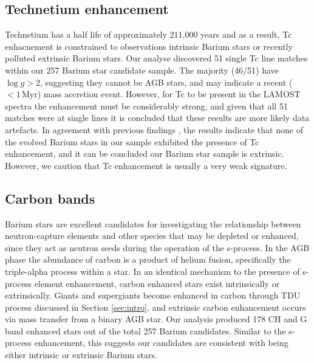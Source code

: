 \documentclass[a4paper,fleqn,usenatbib]{mnras}
\begin{document}
\subsection{Technetium enhancement}

Technetium has a half life of approximately 211,000 years and as a result, Tc enhacnement is constrained to observations intrinsic Barium stars \citep{jorissen1993} or recently polluted extrinsic Barium stars. Our analyse discovered 51 single Tc line matches within our 257 Barium star candidate sample. The majority (46/51) have $\log{g} > 2$, suggesting they cannot be AGB stars, and may indicate a recent ($<1\,\textrm{Myr}$) mass accretion event. However, for Tc to be present in the LAMOST spectra the enhancement must be considerably strong, and given that all 51 matches were at single lines it is concluded that these results are more likely data artefacts. In agreement with previous findings \citep[e.g.,][]{little1987,smith1984,smith1983}, the results indicate that none of the evolved Barium stars in our sample exhibited the presence of Tc enhancement, and it can be concluded our Barium star sample is extrinsic. However, we caution that Tc enhancement is usually a very weak signature.

\subsection{Carbon bands}
Barium stars are excellent candidates for investigating the relationship between neutron-capture elements and other species that may be depleted or enhanced, since they act as neutron seeds during the operation of the s-process. In the AGB phase the abundance of carbon is a product of helium fusion, specifically the triple-alpha process within a star. In an identical mechanism to the presence of s-process element enhancement, carbon enhanced stars exist intrinsically or extrinsically. Giants and supergiants become enhanced in carbon through TDU process discussed in Section \ref{sec:intro}, and extrinsic carbon enhancement occurs via mass transfer from a binary AGB star. Our analysis produced 178 CH and G band enhanced stars out of the total 257 Barium candidates. Similar to the s-process enhancement, this suggests our candidates are consistent with being either intrinsic or extrinsic Barium stars.
\end{document}
